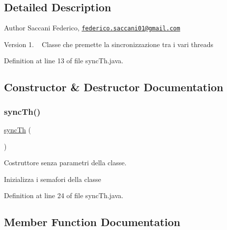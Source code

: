 \subsection{Detailed Description}
\begin{DoxyAuthor}{Author}
Saccani Federico, \href{mailto:federico.saccani01@gmail.com}{\tt federico.\+saccani01@gmail.\+com} 
\end{DoxyAuthor}
\begin{DoxyVersion}{Version}
1. ~\newline
Classe che premette la sincronizzazione tra i vari threads 
\end{DoxyVersion}


Definition at line 13 of file sync\+Th.\+java.



\subsection{Constructor \& Destructor Documentation}
\mbox{\label{class_snake_1_1game_1_1utility_1_1sync_th_abef3d4e3630108b2352b7741358a40e6}} 
\subsubsection{\texorpdfstring{sync\+Th()}{syncTh()}}
{\footnotesize\ttfamily \mbox{\hyperlink{class_snake_1_1game_1_1utility_1_1sync_th}{sync\+Th}} (\begin{DoxyParamCaption}{ }\end{DoxyParamCaption})}



Costruttore senza parametri della classe. 

Inizializza i semafori della classe 

Definition at line 24 of file sync\+Th.\+java.



\subsection{Member Function Documentation}
\mbox{\label{class_snake_1_1game_1_1utility_1_1sync_th_a1fb318d4f1722f999b5af474befc8b67}} 
